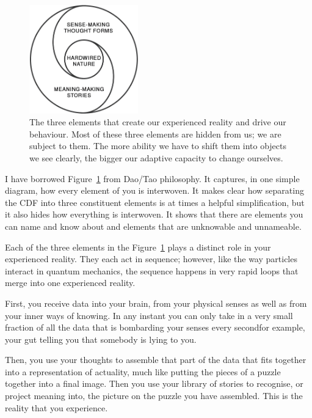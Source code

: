 \begin{figure}
\includegraphics[width=0.42\textwidth]{./Images/yin-yang-dao}
\caption[Three elements shaping our reality and driving behaviour]{The three elements that create our experienced reality and drive our behaviour. Most of these three elements are hidden from us; we are subject to them. The more ability we have to shift them into objects we see clearly, the bigger our adaptive capacity to change ourselves.}
\label{fig:yin-yang-dao}
\end{figure}


I have borrowed Figure~\ref{fig:yin-yang-dao} from Dao/Tao philosophy.  It captures, in one simple diagram, how every element of you is interwoven. It makes clear how separating the CDF into three constituent elements is at times a helpful simplification, but it also hides how everything is interwoven. It shows that there are elements you can name and know about and elements that are unknowable and unnameable.


Each of the three elements in the Figure~\ref{fig:yin-yang-dao} plays a distinct role in your experienced reality. They each act in sequence; however, like the way particles interact in quantum mechanics, the sequence happens in very rapid loops that merge into one experienced reality.


First, you receive data into your brain, from your physical senses as well as from your inner ways of knowing. In any instant you can only take in a very small fraction of all the data that is bombarding your senses every second\textemdash for example, your gut telling you that somebody is lying to you.


Then, you use your thoughts to assemble that part of the data that fits together into a representation of actuality, much like putting the pieces of a puzzle together into a final image. Then you use your library of stories to recognise, or project meaning into, the picture on the puzzle you have assembled. This is the reality that you experience.


